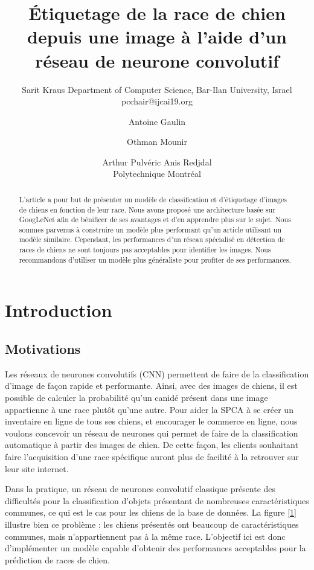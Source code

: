 \documentclass{article}
\title{Étiquetage de la race de chien depuis une image à l'aide d'un réseau de neurone convolutif}
\author{
    Sarit Kraus
    \affiliations
    Department of Computer Science, Bar-Ilan University, Israel \emails
    pcchair@ijcai19.org
}
\author{
Antoine Gaulin\and
Othman Mounir\and
Arthur Pulvéric\And
Anis Redjdal\\
\affiliations
Polytechnique Montréal\\
}
\begin{document}
\maketitle

\begin{abstract}
L'article a pour but de présenter un modèle de classification et d'étiquetage
d'images de chiens en fonction de leur race. Nous avons proposé une
architecture basée sur GoogLeNet afin de bénificer de ses avantages et d'en
apprendre plus sur le sujet. Nous sommes parvenus à construire un modèle plus 
performant qu'un article utilisant un modèle similaire. Cependant, les
performances d'un réseau spécialisé en détection de races de chiens ne sont
toujours pas acceptables pour identifier les images. Nous recommandons d'utiliser un modèle plus généraliste pour profiter de ses performances.

\end{abstract}

\section{Introduction}

\subsection{Motivations}
Les réseaux de neurones convolutifs (CNN) permettent de faire de la
classification d'image de façon rapide et performante. Ainsi, avec des images de
chiens, il est possible de calculer la probabilité qu'un canidé présent dans une
image appartienne à une race plutôt qu’une autre. Pour aider la SPCA à se créer
un inventaire en ligne de tous ses chiens, et encourager le commerce en ligne,
nous voulons concevoir un réseau de neurones qui permet de faire de la
classification automatique à partir des images de chien. De cette façon, les
clients souhaitant faire l'acquisition d'une race spécifique auront plus de
facilité à la retrouver sur leur site internet.

Dans la pratique, un réseau de neurones convolutif classique présente des
difficultés pour la classification d’objets présentant de nombreuses
caractéristiques communes, ce qui est le cas pour les chiens de la base de 
données. La figure \ref{1} illustre bien ce problème : les chiens présentés ont
beaucoup de caractéristiques communes, mais n’appartiennent pas à la même race.
L’objectif ici est donc d’implémenter un modèle capable d’obtenir des
performances acceptables pour la prédiction de races de chien.
\end{document}
